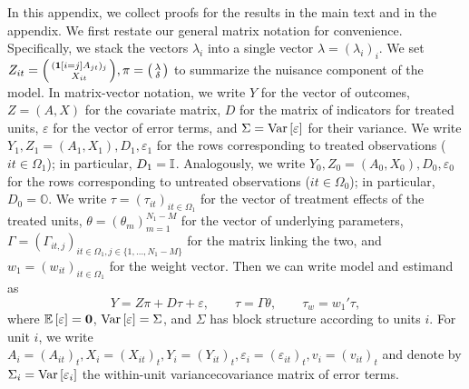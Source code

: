 \documentclass[english,11pt]{article}
\theoremstyle{plain}
\theoremstyle{plain}
\theoremstyle{plain}
\theoremstyle{plain}
\begin{document}
In this appendix, we collect proofs for the results in the main text
and in the appendix. We first restate our general matrix notation
for convenience. Specifically, we stack the vectors $\lambda_{i}$
into a single vector $\lambda=(\lambda_{i})_{i}$. We set $Z_{it}=\begin{psmallmatrix}(\mathbf{1}\left[i=j\right]A_{jt})_{j}\\X_{it}\end{psmallmatrix},\pi=\begin{psmallmatrix}\lambda\\\delta\end{psmallmatrix}$
to summarize the nuisance component of the model. In matrix-vector
notation, we write $Y$ for the vector of outcomes, $Z=(A,X)$ for
the covariate matrix, $D$ for the matrix of indicators for treated
units, $\varepsilon$ for the vector of error terms, and $\Sigma=\mathrm{Var}\left[\varepsilon\right]$
for their variance. We write $Y_{1},Z_{1}=(A_{1},X_{1}),D_{1},\varepsilon_{1}$
for the rows corresponding to treated observations ($it\in\Omega_{1}$);
in particular, $D_{1}=\mathbb{I}$. Analogously, we write $Y_{0},Z_{0}=(A_{0},X_{0}),D_{0},\varepsilon_{0}$
for the rows corresponding to untreated observations ($it\in\Omega_{0}$);
in particular, $D_{0}=\mathbb{O}$. We write $\tau=(\tau_{it})_{it\in\Omega_{1}}$
for the vector of treatment effects of the treated units, $\theta=(\theta_{m})_{m=1}^{N_{1}-M}$
for the vector of underlying parameters, $\Gamma=(\Gamma_{it,j})_{it\in\Omega_{1},j\in\{1,\ldots,N_{1}-M\}}$
for the matrix linking the two, and $w_{1}=(w_{it})_{it\in\Omega_{1}}$
for the weight vector. Then we can write model and estimand as
\[
Y=Z\pi+D\tau+\varepsilon,\qquad\tau=\Gamma\theta,\qquad\tau_{w}=w_{1}'\tau,
\]
where $\mathbb{E}\left[\varepsilon\right]=\textbf{0}$, $\mathrm{Var}\left[\varepsilon\right]=\Sigma$, and
$\Sigma$ has block structure according to units $i$. For unit $i$,
we write $A_{i}=(A_{it})_{t},X_{i}=(X_{it})_{t},Y_{i}=(Y_{it})_{t},\varepsilon_{i}=(\varepsilon_{it})_{t},v_{i}=(v_{it})_{t}$
and denote by $\Sigma_{i}=\mathrm{Var}\left[\varepsilon_{i}\right]$ the within-unit
variance\textendash covariance matrix of error terms.
\end{document}

